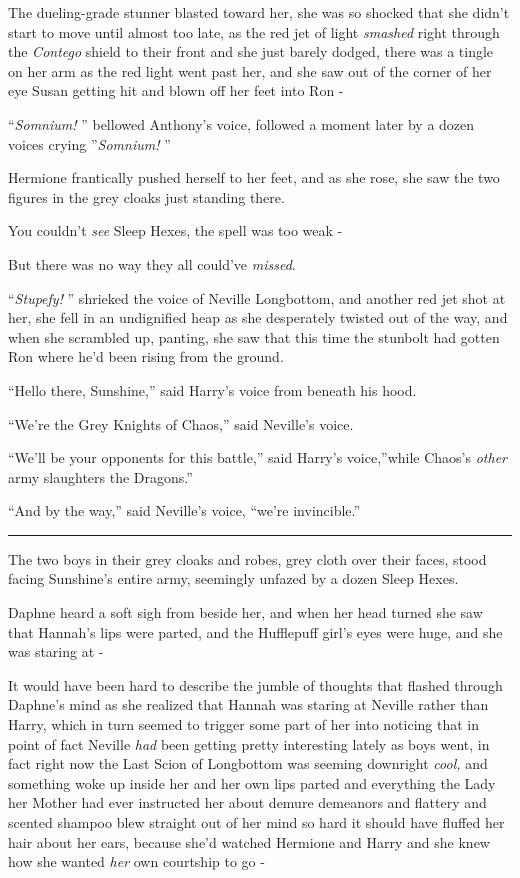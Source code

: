 The dueling-grade stunner blasted toward her, she was so shocked that
she didn't start to move until almost too late, as the red jet of light
\emph{smashed} right through the \emph{Contego} shield to their front
and she just barely dodged, there was a tingle on her arm as the red
light went past her, and she saw out of the corner of her eye Susan
getting hit and blown off her feet into Ron -

``\emph{Somnium!} '' bellowed Anthony's voice, followed a moment later by
a dozen voices crying ''\emph{Somnium!} ''

Hermione frantically pushed herself to her feet, and as she rose, she
saw the two figures in the grey cloaks just standing there.

You couldn't \emph{see} Sleep Hexes, the spell was too weak -

But there was no way they all could've \emph{missed}.

``\emph{Stupefy!} '' shrieked the voice of Neville Longbottom, and another
red jet shot at her, she fell in an undignified heap as she desperately
twisted out of the way, and when she scrambled up, panting, she saw that
this time the stunbolt had gotten Ron where he'd been rising from the
ground.

``Hello there, Sunshine,'' said Harry's voice from beneath his hood.

``We're the Grey Knights of Chaos,'' said Neville's voice.

``We'll be your opponents for this battle,'' said Harry's voice,''while
Chaos's \emph{other} army slaughters the Dragons.''

``And by the way,'' said Neville's voice, ``we're invincible.''

\begin{center}\rule{3in}{0.4pt}\end{center}

The two boys in their grey cloaks and robes, grey cloth over their
faces, stood facing Sunshine's entire army, seemingly unfazed by a dozen
Sleep Hexes.

Daphne heard a soft sigh from beside her, and when her head turned she
saw that Hannah's lips were parted, and the Hufflepuff girl's eyes were
huge, and she was staring at -

It would have been hard to describe the jumble of thoughts that flashed
through Daphne's mind as she realized that Hannah was staring at Neville
rather than Harry, which in turn seemed to trigger some part of her into
noticing that in point of fact Neville \emph{had} been getting pretty
interesting lately as boys went, in fact right now the Last Scion of
Longbottom was seeming downright \emph{cool,} and something woke up
inside her and her own lips parted and everything the Lady her Mother
had ever instructed her about demure demeanors and flattery and scented
shampoo blew straight out of her mind so hard it should have fluffed her
hair about her ears, because she'd watched Hermione and Harry and she
knew how she wanted \emph{her} own courtship to go -

